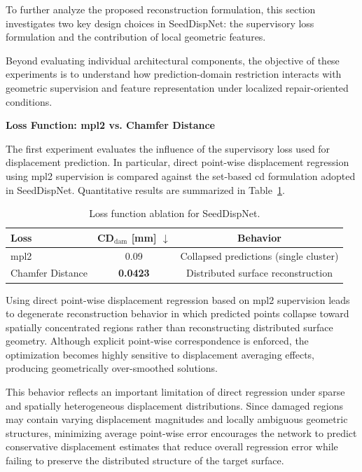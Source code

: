 To further analyze the proposed reconstruction formulation, this section investigates two key design choices in SeedDispNet: the supervisory loss formulation and the contribution of local geometric features.

Beyond evaluating individual architectural components, the objective of these experiments is to understand how prediction-domain restriction interacts with geometric supervision and feature representation under localized repair-oriented conditions.

\vspace{5mm}
\noindent\textbf{Loss Function: \ac{mpl2} vs. Chamfer Distance}
\vspace{2mm}

The first experiment evaluates the influence of the supervisory loss used for displacement prediction. In particular, direct point-wise displacement regression using \ac{mpl2} supervision is compared against the set-based \ac{cd} formulation adopted in SeedDispNet. Quantitative results are summarized in Table~\ref{tab:loss_ablation_results}.

\begin{table}[h]
\centering
\caption{Loss function ablation for SeedDispNet.}
\label{tab:loss_ablation_results}
\begin{tabular}{l c c}
\hline
\textbf{Loss} & \textbf{CD$_\text{dam}$ [mm]} $\downarrow$ & \textbf{Behavior} \\
\hline
\ac{mpl2} & 0.09 & Collapsed predictions (single cluster) \\
Chamfer Distance & \textbf{0.0423} & Distributed surface reconstruction \\
\hline
\end{tabular}
\end{table}

Using direct point-wise displacement regression based on \ac{mpl2} supervision leads to degenerate reconstruction behavior in which predicted points collapse toward spatially concentrated regions rather than reconstructing distributed surface geometry. Although explicit point-wise correspondence is enforced, the optimization becomes highly sensitive to displacement averaging effects, producing geometrically over-smoothed solutions.

This behavior reflects an important limitation of direct regression under sparse and spatially heterogeneous displacement distributions. Since damaged regions may contain varying displacement magnitudes and locally ambiguous geometric structures, minimizing average point-wise error encourages the network to predict conservative displacement estimates that reduce overall regression error while failing to preserve the distributed structure of the target surface.

